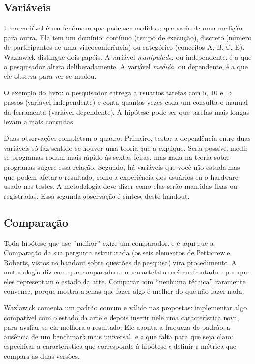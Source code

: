 \documentclass[10pt,a4paper]{extarticle}
\theoremstyle{definition}
\begin{document}
\subsection{Variáveis}

Uma variável é um fenômeno que pode ser medido e que varia de uma medição para outra. Ela tem um domínio: contínuo (tempo de execução), discreto (número de participantes de uma videoconferência) ou categórico (conceitos A, B, C, E). Wazlawick distingue dois papéis. A variável \emph{manipulada}, ou independente, é a que o pesquisador altera deliberadamente. A variável \emph{medida}, ou dependente, é a que ele observa para ver se mudou.

O exemplo do livro: o pesquisador entrega a usuários tarefas com 5, 10 e 15 passos (variável independente) e conta quantas vezes cada um consulta o manual da ferramenta (variável dependente). A hipótese pode ser que tarefas mais longas levam a mais consultas.

Duas observações completam o quadro. Primeiro, testar a dependência entre duas variáveis só faz sentido se houver uma teoria que a explique. Seria possível medir se programas rodam mais rápido às sextas-feiras, mas nada na teoria sobre programas sugere essa relação. Segundo, há variáveis que você não estuda mas que podem afetar o resultado, como a experiência dos usuários ou o hardware usado nos testes. A metodologia deve dizer como elas serão mantidas fixas ou registradas. Essa segunda observação é síntese deste handout.

\subsection{Comparação}

Toda hipótese que use \enquote{melhor} exige um comparador, e é aqui que a Comparação da sua pergunta estruturada (os seis elementos de Petticrew e Roberts, vistos no handout sobre questões de pesquisa) vira procedimento. A metodologia diz com que comparadores o seu artefato será confrontado e por que eles representam o estado da arte. Comparar com \enquote{nenhuma técnica} raramente convence, porque mostra apenas que fazer algo é melhor do que não fazer nada.

Wazlawick comenta um padrão comum e válido nas propostas: implementar algo compatível com o estado da arte e depois inserir nele uma característica nova, para avaliar se ela melhora o resultado. Ele aponta a fraqueza do padrão, a ausência de um benchmark mais universal, e o que falta para que seja claro: especificar a característica que corresponde à hipótese e definir a métrica que compara as duas versões.
\end{document}

